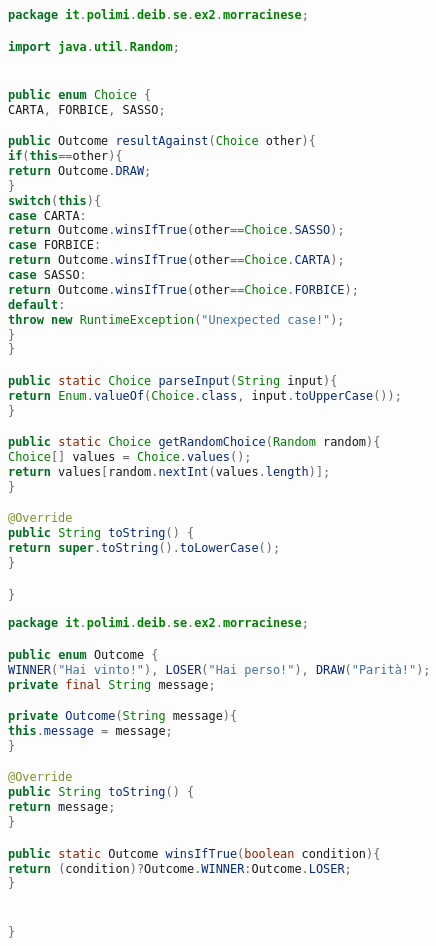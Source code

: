 \documentclass{article}
\begin{document}
\begin{lstlisting}[language=Java,escapechar=|]
package it.polimi.deib.se.ex2.morracinese;

import java.util.Random;


public enum Choice {
CARTA, FORBICE, SASSO;

public Outcome resultAgainst(Choice other){
if(this==other){
return Outcome.DRAW;
}
switch(this){
case CARTA:
return Outcome.winsIfTrue(other==Choice.SASSO);		
case FORBICE:
return Outcome.winsIfTrue(other==Choice.CARTA);		
case SASSO:
return Outcome.winsIfTrue(other==Choice.FORBICE);	
default:
throw new RuntimeException("Unexpected case!");		
}		
}

public static Choice parseInput(String input){
return Enum.valueOf(Choice.class, input.toUpperCase());
}

public static Choice getRandomChoice(Random random){
Choice[] values = Choice.values();
return values[random.nextInt(values.length)];
}

@Override
public String toString() {
return super.toString().toLowerCase();
}

}
\end{lstlisting}
\begin{lstlisting}[language=Java,escapechar=|]
package it.polimi.deib.se.ex2.morracinese;

public enum Outcome {
WINNER("Hai vinto!"), LOSER("Hai perso!"), DRAW("Parità!");
private final String message;

private Outcome(String message){
this.message = message;
}

@Override
public String toString() {
return message;
}

public static Outcome winsIfTrue(boolean condition){
return (condition)?Outcome.WINNER:Outcome.LOSER;
}


}
\end{lstlisting}
\end{document}
